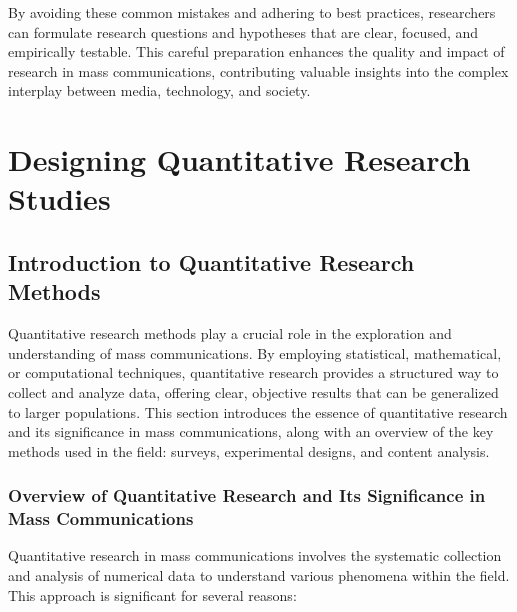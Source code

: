 \documentclass[
]{book}
\begin{document}
By avoiding these common mistakes and adhering to best practices, researchers can formulate research questions and hypotheses that are clear, focused, and empirically testable. This careful preparation enhances the quality and impact of research in mass communications, contributing valuable insights into the complex interplay between media, technology, and society.

\hypertarget{designing-quantitative-research-studies}{%
\chapter{Designing Quantitative Research Studies}\label{designing-quantitative-research-studies}}

\hypertarget{introduction-to-quantitative-research-methods}{%
\section{Introduction to Quantitative Research Methods}\label{introduction-to-quantitative-research-methods}}

Quantitative research methods play a crucial role in the exploration and understanding of mass communications. By employing statistical, mathematical, or computational techniques, quantitative research provides a structured way to collect and analyze data, offering clear, objective results that can be generalized to larger populations. This section introduces the essence of quantitative research and its significance in mass communications, along with an overview of the key methods used in the field: surveys, experimental designs, and content analysis.

\hypertarget{overview-of-quantitative-research-and-its-significance-in-mass-communications}{%
\subsection*{Overview of Quantitative Research and Its Significance in Mass Communications}\label{overview-of-quantitative-research-and-its-significance-in-mass-communications}}

Quantitative research in mass communications involves the systematic collection and analysis of numerical data to understand various phenomena within the field. This approach is significant for several reasons:
\end{document}
